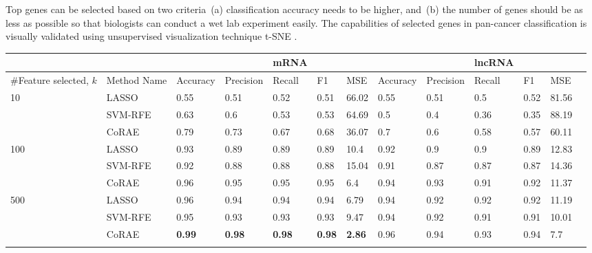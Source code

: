 \documentclass{bioinfo}
\begin{document}
Top genes can be selected based on two criteria~(a) classification accuracy needs to be higher,
and~(b) the number of genes should be as less as possible so that biologists can conduct a wet lab experiment
easily. The capabilities of selected genes in pan-cancer classification is visually validated using unsupervised visualization technique t-SNE \citep{maaten2008visualizing}.
\begin{table}[hbt]
{\begin{tabular}{@{}ll|lllll|llllll@{}}
\toprule
& & & &mRNA&&& & &lncRNA&&& \\
\midrule
\#Feature selected, $k$ & Method Name	&	Accuracy	&	Precision	&	Recall	&	F1	& MSE &	Accuracy	&	Precision	&	Recall	&	F1	& MSE	\\
\midrule
\multirow{3}{*}{10} &	LASSO	&	0.55	&	0.51	&	0.52	&	0.51	&	66.02	&	0.55	&	0.51	&	0.5	&	0.52	&	81.56	\\
&	SVM-RFE	&	0.63	&	0.6	&	0.53	&	0.53	&	64.69	&	0.5	&	0.4	&	0.36	&	0.35	&	88.19	\\
&	CoRAE	&	0.79	&	0.73	&	0.67	&	0.68	&	36.07	&	0.7	&	0.6	&	0.58	&	0.57	&	60.11	\\
\midrule


\multirow{3}{*}{100} &	LASSO	&	0.93	&	0.89	&	0.89	&	0.89	&	10.4	&	0.92	&	0.9	&	0.9	&	0.89	&	12.83	\\
&	SVM-RFE	&	0.92	&	0.88	&	0.88	&	0.88	&	15.04	&	0.91	&	0.87	&	0.87	&	0.87	&	14.36	\\
&	CoRAE	&	0.96	&	0.95	&	0.95	&	0.95	&	6.4	&	0.94	&	0.93	&	0.91	&	0.92	&	11.37	\\

\midrule

\multirow{3}{*}{500} &	LASSO	&	0.96	&	0.94	&	0.94	&	0.94	&	6.79	&	0.94	&	0.92	&	0.92	&	0.92	&	11.19	\\
&	SVM-RFE	&	0.95	&	0.93	&	0.93	&	0.93	&	9.47	&	0.94	&	0.92	&	0.91	&	0.91	&	10.01	\\
&	CoRAE	&	\textbf{0.99}	&	\textbf{0.98}	&	\textbf{0.98	}&	\textbf{0.98}	&	\textbf{2.86}	&	0.96	&	0.94	&	0.93	&	0.94	&	7.7	\\
\botrule
\end{tabular}}{}
\end{table}
\end{document}
